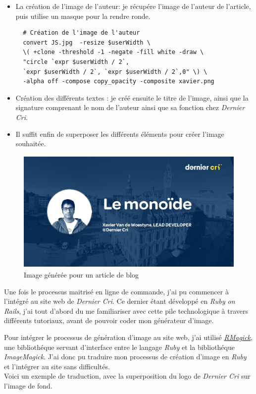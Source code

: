 \documentclass[12pt,a4paper]{article}
\begin{document}
  \begin{itemize}
  \item
    La création de l'image de l'auteur: je récupére l'image de l'auteur de
    l'article, puis utilise un masque pour la rendre ronde.

  \begin{verbatim}
  # Création de l'image de l'auteur
  convert JS.jpg  -resize $userWidth \
  \( +clone -threshold -1 -negate -fill white -draw \
  "circle `expr $userWidth / 2`,
  `expr $userWidth / 2`, `expr $userWidth / 2`,0" \) \
  -alpha off -compose copy_opacity -composite xavier.png
  \end{verbatim}
  \item
    Création des différents textes : je créé ensuite le titre de l'image,
    ainsi que la signature comprenant le nom de l'auteur ainsi que sa
    fonction chez \emph{Dernier Cri}.
  \item
    Il suffit enfin de superposer les différents éléments pour créer
    l'image souhaitée.
  \end{itemize}

  \begin{figure}[h]
    \centering
    \includegraphics[height=6cm]{figures/blog.png}
    \caption{Image générée pour un article de blog}
  \end{figure}

  \bigskip

  Une fois le processus maitrisé en ligne de commande, j'ai pu commencer à
  l'intégré au site web de \emph{Dernier Cri}. Ce dernier étant développé
  en \emph{Ruby on Rails}, j'ai tout d'abord du me familiariser avec cette
  pile technologique à travers différents tutoriaux, avant de pouvoir
  coder mon générateur d'image.

  \bigskip

  Pour intégrer le processus de génération d'image au site web, j'ai
  utilisé \href{https://github.com/rmagick/rmagick}{\emph{RMagick}}, une
  bibliothéque servant d'interface entre le langage \emph{Ruby} et la
  bibliothéque \emph{ImageMagick}. J'ai donc pu traduire mon processus de
  création d'image en \emph{Ruby} et l'intégrer au site sans
  difficultés.\\
  Voici un exemple de traduction, avec la superposition du logo de
  \emph{Dernier Cri} sur l'image de fond.
\end{document}
